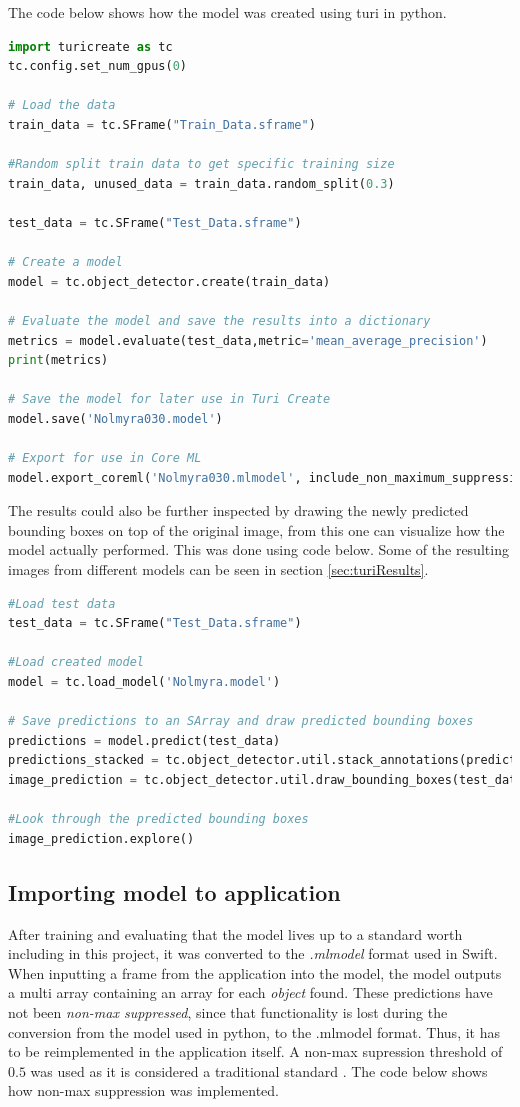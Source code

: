 The code below shows how the model was created using turi in python.
\begin{lstlisting}[language=python]
import turicreate as tc
tc.config.set_num_gpus(0)

# Load the data
train_data = tc.SFrame("Train_Data.sframe")

#Random split train data to get specific training size
train_data, unused_data = train_data.random_split(0.3)

test_data = tc.SFrame("Test_Data.sframe")

# Create a model
model = tc.object_detector.create(train_data)

# Evaluate the model and save the results into a dictionary
metrics = model.evaluate(test_data,metric='mean_average_precision')
print(metrics)

# Save the model for later use in Turi Create
model.save('Nolmyra030.model')

# Export for use in Core ML
model.export_coreml('Nolmyra030.mlmodel', include_non_maximum_suppression=False)
\end{lstlisting}
The results could also be further inspected by drawing the newly predicted bounding boxes on top of the original image, from this one can visualize how the model actually performed. This was done using code below. Some of the resulting images from different models can be seen in section \ref{sec:turiResults}. 

\begin{lstlisting}[language=python]
#Load test data
test_data = tc.SFrame("Test_Data.sframe")

#Load created model
model = tc.load_model('Nolmyra.model')

# Save predictions to an SArray and draw predicted bounding boxes
predictions = model.predict(test_data)
predictions_stacked = tc.object_detector.util.stack_annotations(predictions)
image_prediction = tc.object_detector.util.draw_bounding_boxes(test_data['image'], predictions)

#Look through the predicted bounding boxes
image_prediction.explore()
\end{lstlisting}

\subsection{Importing model to application}
After training and evaluating that the model lives up to a standard worth including in this
 project, it was converted to the \textit{.mlmodel} format used in Swift. When inputting a frame from the
application into the model, the model outputs a multi array containing an array for each
  \textit{object} found. These predictions have not been \textit{non-max suppressed}, since that functionality is lost during the conversion from the model used in python, to the .mlmodel format. Thus, it has to be reimplemented in the application itself. 
  A non-max supression threshold of $0.5$ was used as it is considered a traditional standard \cite{nms}. The code below shows how non-max suppression was implemented. 

